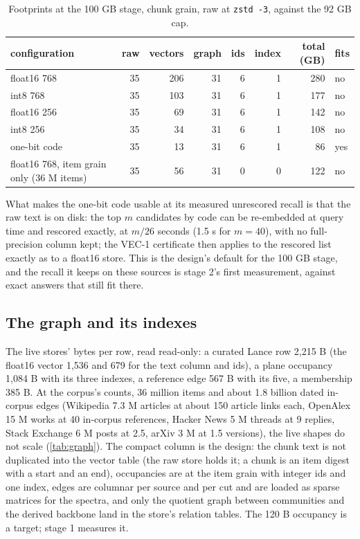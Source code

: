 \documentclass[11pt]{article}
\theoremstyle{plain}
\theoremstyle{definition}
\theoremstyle{remark}
\newcommand{\code}[1]{\texttt{#1}}
\begin{document}
\begin{table}[t]
\centering
\caption{Footprints at the 100 GB stage, chunk grain, raw at \code{zstd -3}, against the 92 GB cap.}\label{tab:fits}
\small
\begin{tabular}{lrrrrrrl}
\toprule
configuration & raw & vectors & graph & ids & index & total (GB) & fits \\
\midrule
float16 768 & 35 & 206 & 31 & 6 & 1 & 280 & no \\
int8 768 & 35 & 103 & 31 & 6 & 1 & 177 & no \\
float16 256 & 35 & 69 & 31 & 6 & 1 & 142 & no \\
int8 256 & 35 & 34 & 31 & 6 & 1 & 108 & no \\
one-bit code & 35 & 13 & 31 & 6 & 1 & 86 & yes \\
float16 768, item grain only (36 M items) & 35 & 56 & 31 & 0 & 0 & 122 & no \\
\bottomrule
\end{tabular}
\end{table}

What makes the one-bit code usable at its measured unrescored recall is that the raw text is on
disk: the top $m$ candidates by code can be re-embedded at query time and rescored exactly, at
$m/26$ seconds (1.5 s for $m=40$), with no full-precision column kept; the VEC-1 certificate then
applies to the rescored list exactly as to a float16 store. This is the design's default for the
100 GB stage, and the recall it keeps on these sources is stage 2's first measurement, against
exact answers that still fit there.

\subsection{The graph and its indexes}\label{sec:graph}
The live stores' bytes per row, read read-only: a curated Lance row 2,215 B (the float16 vector
1,536 and 679 for the text column and ids), a plane occupancy 1,084 B with its three indexes, a
reference edge 567 B with its five, a membership 385 B. At the corpus's counts, 36 million items and
about 1.8 billion dated in-corpus edges (Wikipedia 7.3 M articles at about 150 article links each,
OpenAlex 15 M works at 40 in-corpus references, Hacker News 5 M threads at 9 replies, Stack
Exchange 6 M posts at 2.5, arXiv 3 M at 1.5 versions), the live shapes do not scale
(\cref{tab:graph}). The compact column is the design: the chunk text is not duplicated into the
vector table (the raw store holds it; a chunk is an item digest with a start and an end),
occupancies are at the item grain with integer ids and one index, edges are columnar per source
and per cut and are loaded as sparse matrices for the spectra, and only the quotient graph between
communities and the derived backbone land in the store's relation tables. The 120 B occupancy is a
target; stage 1 measures it.
\end{document}
